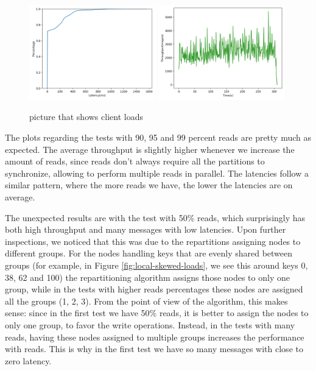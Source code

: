 \begin{figure}[!htb]
  \centering
  \includegraphics[width=0.49\textwidth,height=\textheight,keepaspectratio]{img/local1_lat.png}
  \includegraphics[width=0.49\textwidth,height=\textheight,keepaspectratio]{img/local1_tp.png}
  \caption{ picture that shows client loads }
  \label{fig:local1-performance}
\end{figure}

The plots regarding the tests with 90, 95 and 99 percent reads are pretty much as expected. The average throughput is slightly higher whenever we increase the amount of reads, since reads don't always require all the partitions to synchronize, allowing to perform multiple reads in parallel. The latencies follow a similar pattern, where the more reads we have, the lower the latencies are on average.

The unexpected results are with the test with 50\% reads, which surprisingly has both high throughput and many messages with low latencies. Upon further inspections, we noticed that this was due to the repartitions assigning nodes to different groups. For the nodes handling keys that are evenly shared between groups (for example, in Figure \ref{fig:local-skewed-loads}, we see this around keys 0, 38, 62 and 100) the repartitioning algorithm assigns those nodes to only one group, while in the tests with higher reads percentages these nodes are assigned all the groups (1, 2, 3). From the point of view of the algorithm, this makes sense: since in the first test we have 50\% reads, it is better to assign the nodes to only one group, to favor the write operations. Instead, in the tests with many reads, having these nodes assigned to multiple groups increases the performance with reads. This is why in the first test we have so many messages with close to zero latency.



